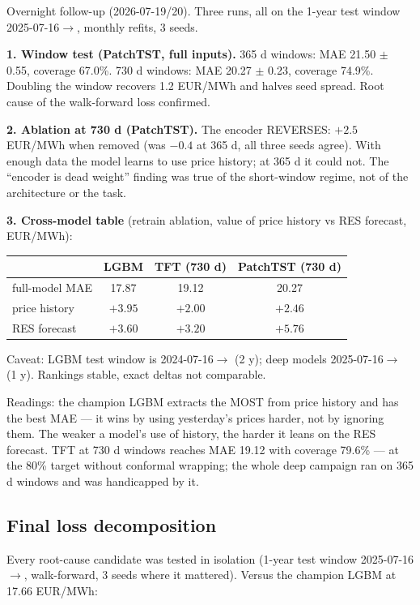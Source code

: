 Overnight follow-up (2026-07-19/20). Three runs, all on the 1-year test
window 2025-07-16$\to$, monthly refits, 3 seeds.

\textbf{1. Window test (PatchTST, full inputs).} 365 d windows: MAE
21.50 $\pm$ 0.55, coverage 67.0\%. 730 d windows: MAE 20.27 $\pm$ 0.23,
coverage 74.9\%. Doubling the window recovers 1.2 EUR/MWh and halves
seed spread. Root cause of the walk-forward loss confirmed.

\textbf{2. Ablation at 730 d (PatchTST).} The encoder REVERSES:
$+2.5$ EUR/MWh when removed (was $-0.4$ at 365 d, all three seeds
agree). With enough data the model learns to use price history; at
365 d it could not. The ``encoder is dead weight'' finding was true
of the short-window regime, not of the architecture or the task.

\textbf{3. Cross-model table} (retrain ablation, value of price
history vs RES forecast, EUR/MWh):

\begin{center}
\begin{tabular}{lccc}
\toprule
 & LGBM & TFT (730 d) & PatchTST (730 d) \\
\midrule
full-model MAE & 17.87 & 19.12 & 20.27 \\
price history  & $+3.95$ & $+2.00$ & $+2.46$ \\
RES forecast   & $+3.60$ & $+3.20$ & $+5.76$ \\
\bottomrule
\end{tabular}
\end{center}

Caveat: LGBM test window is 2024-07-16$\to$ (2 y); deep models
2025-07-16$\to$ (1 y). Rankings stable, exact deltas not comparable.

Readings: the champion LGBM extracts the MOST from price history and
has the best MAE --- it wins by using yesterday's prices harder, not by
ignoring them. The weaker a model's use of history, the harder it leans
on the RES forecast. TFT at 730 d windows reaches MAE 19.12 with
coverage 79.6\% --- at the 80\% target without conformal wrapping; the
whole deep campaign ran on 365 d windows and was handicapped by it.

\subsection{Final loss decomposition}

Every root-cause candidate was tested in isolation (1-year test window
2025-07-16$\to$, walk-forward, 3 seeds where it mattered). Versus the
champion LGBM at 17.66 EUR/MWh:

